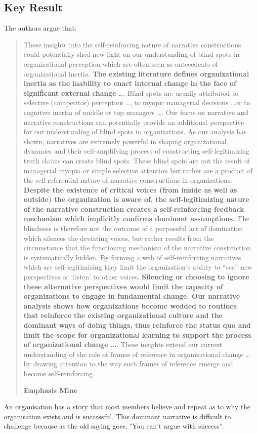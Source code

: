 \subsection{Key Result}
The authors argue that:\\
\begin{quote}
 These insights into the self-reinforcing nature of narrative constructions could potentially shed new light on our understanding of blind spots in organizational perception which are often seen as antecedents of organizational inertia. {\bf The existing literature defines organizational inertia as the inability to enact internal change in the face of significant external change} \ldots . Blind spots are usually attributed to selective (competitor) perception \ldots, to myopic managerial decisions \ldots  or to cognitive inertia of middle or top managers \ldots . Our focus on narrative and narrative constructions can potentially provide an additional perspective for our understanding of blind spots in organizations. As our analysis has shown, narratives are extremely powerful in shaping organizational dynamics and their self-amplifying process of constructing self-legitimizing truth claims can create blind spots. These blind spots are not the result of managerial myopia or simple selective attention but rather are a product of the self-referential nature of narrative constructions in organizations. {\bf Despite the existence of critical voices (from inside as well as outside) the organization is aware of, the self-legitimizing nature of the narrative construction creates a self-reinforcing feedback mechanism which implicitly confirms dominant assumptions.} The blindness is therefore not the outcome of a purposeful act of domination which silences the deviating voices, but rather results from the circumstance that the functioning mechanism of the narrative construction is systematically hidden. By forming a web of self-reinforcing narratives which are self-legitimizing they limit the organization’s ability to “see” new perspectives or ‘listen’ to other voices. {\bf Silencing or choosing to ignore these alternative perspectives would limit the capacity of organizations to engage in fundamental change. Our narrative analysis shows how organizations become wedded to routines that reinforce the existing organizational culture and the dominant ways of doing things, thus reinforce the status quo and limit the scope for organizational learning to support the process of organizational change \ldots}. These insights extend our current understanding of the role of frames of reference in organizational change \ldots by drawing attention to the way such frames of reference emerge and become self-reinforcing.\\
\begin{flushright}
{\bf Emphasis Mine}
\end{flushright}
\end{quote}

An organisation has a story that most members believe and repeat as to why the organisation exists and is successful. This dominant narrative is difficult to challenge because as the old saying goes: "You can't argue with success".\\







